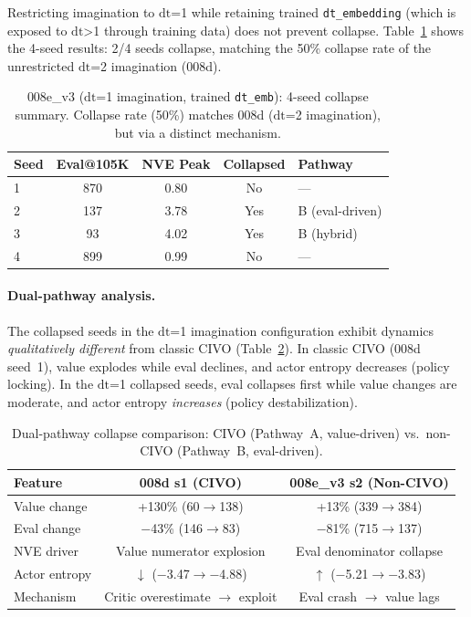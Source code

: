 \documentclass{article}
\newcommand{\dt}{\mathrm{dt}}
\begin{document}
Restricting imagination to $\dt$=1 while retaining trained \texttt{dt\_embedding} (which is exposed to $\dt$>1 through training data) does not prevent collapse.
Table~\ref{tab:008ev3-seeds} shows the 4-seed results: 2/4 seeds collapse, matching the 50\% collapse rate of the unrestricted $\dt$=2 imagination (008d).

\begin{table}[h]
\centering
\caption{008e\_v3 ($\dt$=1 imagination, trained \texttt{dt\_emb}): 4-seed collapse summary.
Collapse rate (50\%) matches 008d ($\dt$=2 imagination), but via a distinct mechanism.}
\label{tab:008ev3-seeds}
\begin{tabular}{lcccl}
\toprule
\textbf{Seed} & \textbf{Eval@105K} & \textbf{NVE Peak} & \textbf{Collapsed} & \textbf{Pathway} \\
\midrule
1 & 870 & 0.80 & No & --- \\
2 & 137 & 3.78 & Yes & B (eval-driven) \\
3 & 93 & 4.02 & Yes & B (hybrid) \\
4 & 899 & 0.99 & No & --- \\
\bottomrule
\end{tabular}
\end{table}

\paragraph{Dual-pathway analysis.}
The collapsed seeds in the $\dt$=1 imagination configuration exhibit dynamics \emph{qualitatively different} from classic CIVO (Table~\ref{tab:dual-pathway}).
In classic CIVO (008d seed~1), value explodes while eval declines, and actor entropy decreases (policy locking).
In the $\dt$=1 collapsed seeds, eval collapses first while value changes are moderate, and actor entropy \emph{increases} (policy destabilization).

\begin{table}[h]
\centering
\caption{Dual-pathway collapse comparison: CIVO (Pathway~A, value-driven) vs.\ non-CIVO (Pathway~B, eval-driven).}
\label{tab:dual-pathway}
\begin{tabular}{lcc}
\toprule
\textbf{Feature} & \textbf{008d s1 (CIVO)} & \textbf{008e\_v3 s2 (Non-CIVO)} \\
\midrule
Value change & +130\% (60$\to$138) & +13\% (339$\to$384) \\
Eval change & $-$43\% (146$\to$83) & $-$81\% (715$\to$137) \\
NVE driver & Value numerator explosion & Eval denominator collapse \\
Actor entropy & $\downarrow$ ($-$3.47$\to$$-$4.88) & $\uparrow$ ($-$5.21$\to$$-$3.83) \\
Mechanism & Critic overestimate $\to$ exploit & Eval crash $\to$ value lags \\
\bottomrule
\end{tabular}
\end{table}
\end{document}
